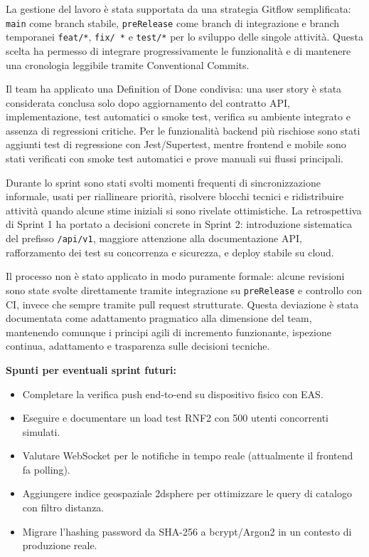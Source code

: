 \documentclass[11pt,a4paper]{article}
\newcommand{\code}[1]{\texttt{#1}}
\begin{document}
  La gestione del lavoro è stata supportata da una strategia Gitflow semplificata: \code{main} come branch stabile, \code{preRelease} come branch di integrazione e branch temporanei \code{feat/*}, \code{fix/
  *} e \code{test/*} per lo sviluppo delle singole attività. Questa scelta ha permesso di integrare progressivamente le funzionalità e di mantenere una cronologia leggibile tramite Conventional Commits.

  Il team ha applicato una Definition of Done condivisa: una user story è stata considerata conclusa solo dopo aggiornamento del contratto API, implementazione, test automatici o smoke test, verifica su
  ambiente integrato e assenza di regressioni critiche. Per le funzionalità backend più rischiose sono stati aggiunti test di regressione con Jest/Supertest, mentre frontend e mobile sono stati verificati
  con smoke test automatici e prove manuali sui flussi principali.

  Durante lo sprint sono stati svolti momenti frequenti di sincronizzazione informale, usati per riallineare priorità, risolvere blocchi tecnici e ridistribuire attività quando alcune stime iniziali si sono
  rivelate ottimistiche. La retrospettiva di Sprint 1 ha portato a decisioni concrete in Sprint 2: introduzione sistematica del prefisso \code{/api/v1}, maggiore attenzione alla documentazione API,
  rafforzamento dei test su concorrenza e sicurezza, e deploy stabile su cloud.

  Il processo non è stato applicato in modo puramente formale: alcune revisioni sono state svolte direttamente tramite integrazione su \code{preRelease} e controllo con CI, invece che sempre tramite pull
  request strutturate. Questa deviazione è stata documentata come adattamento pragmatico alla dimensione del team, mantenendo comunque i principi agili di incremento funzionante, ispezione continua,
  adattamento e trasparenza sulle decisioni tecniche.


\medskip
\noindent\textbf{Spunti per eventuali sprint futuri:}
\begin{itemize}[noitemsep]
  \item Completare la verifica push end-to-end su dispositivo fisico con EAS.
  \item Eseguire e documentare un load test RNF2 con 500 utenti concorrenti simulati.
  \item Valutare WebSocket per le notifiche in tempo reale (attualmente il frontend fa polling).
  \item Aggiungere indice geospaziale 2dsphere per ottimizzare le query di catalogo con filtro distanza.
  \item Migrare l'hashing password da SHA-256 a bcrypt/Argon2 in un contesto di produzione reale.
\end{itemize}
\end{document}
